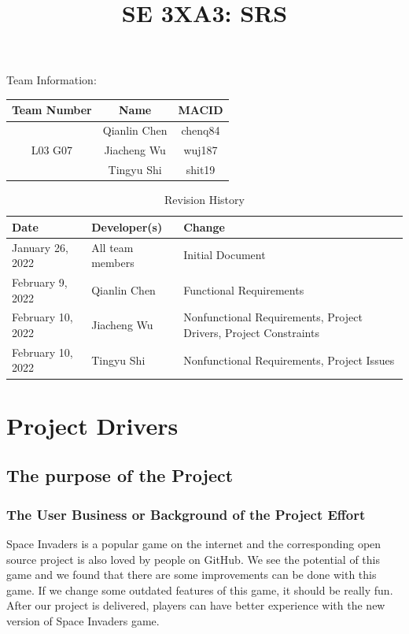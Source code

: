 \documentclass[12pt]{article}
\title{SE 3XA3: SRS}
\begin{document}
\maketitle

{\Large Team Information:}
\begin{table}[htp]
\centering
{\Large
\begin{tabular}{|c|c|c|}
\hline
\multicolumn{1}{|l|}{Team Number} & Name         & MACID   \\ \hline
\multirow{3}{*}{L03 G07}          & Qianlin Chen & chenq84 \\ \cline{2-3} 
                                  & Jiacheng Wu  & wuj187  \\ \cline{2-3} 
                                  & Tingyu Shi   & shit19  \\ \hline
\end{tabular}
}
\end{table}

\begin{table}[htp]
\caption{Revision History} 
\begin{tabularx}{\textwidth}{llX}
\toprule
\textbf{Date} & \textbf{Developer(s)} & \textbf{Change}\\
\midrule
January 26, 2022 & All team members & Initial Document\\
February 9, 2022 & Qianlin Chen & Functional Requirements\\
February 10, 2022 & Jiacheng Wu & Nonfunctional Requirements, Project Drivers, Project Constraints\\
February 10, 2022 & Tingyu Shi & Nonfunctional Requirements, Project Issues\\
\bottomrule
\end{tabularx}
\end{table}
\newpage
\tableofcontents
\listoftables
\listoffigures
\cleardoublepage
\section{Project Drivers}
\subsection{The purpose of the Project}
\subsubsection{The User Business or Background of the Project Effort}
Space Invaders is a popular game on the internet and the
corresponding open source project is also loved by people on GitHub. We see the potential of this game and we found that there are some improvements can be done with this game. If we change some outdated features of this game, it should be really fun. After our project is delivered, players can
have better experience with the new version of Space Invaders game.
\end{document}

